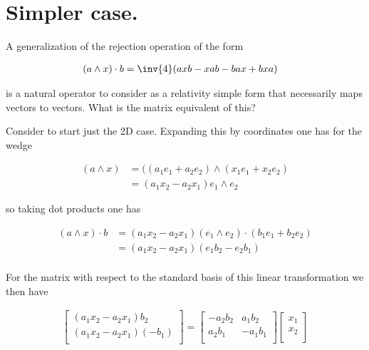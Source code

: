 \section{Simpler case. }

A generalization of the rejection operation of the form

\begin{align*}
(a \wedge x ) \cdot b 
&= \inv{4} ( a x b - x a b - b a x + b x a )
\end{align*}

is a natural operator to consider as a relativity simple form that necessarily maps vectors to vectors.  What is the matrix equivalent of this?

Consider to start just the 2D case.  Expanding this by coordinates one has for the wedge

\begin{align*}
(a \wedge x)
&= ((a_1 e_1 + a_2 e_2) \wedge (x_1 e_1 + x_2 e_2) \\
&= (a_1 x_2 - a_2 x_1) e_1 \wedge e_2
\end{align*}

so taking dot products one has

\begin{align*}
(a \wedge x ) \cdot b
&= (a_1 x_2 - a_2 x_1) (e_1 \wedge e_2) \cdot (b_1 e_1 + b_2 e_2) \\
&= (a_1 x_2 - a_2 x_1) (e_1 b_2 - e_2 b_1) \\
\end{align*}

For the matrix with respect to the standard basis of this linear transformation we then have

\begin{align*}
\begin{bmatrix}
(a_1 x_2 - a_2 x_1) b_2 \\
(a_1 x_2 - a_2 x_1) (-b_1) \\
\end{bmatrix}
=
\begin{bmatrix}
- a_2 b_2 & a_1 b_2  \\
a_2 b_1 & -a_1 b_1 \\
\end{bmatrix}
\begin{bmatrix}
x_1 \\
x_2 \\
\end{bmatrix}
\end{align*}

